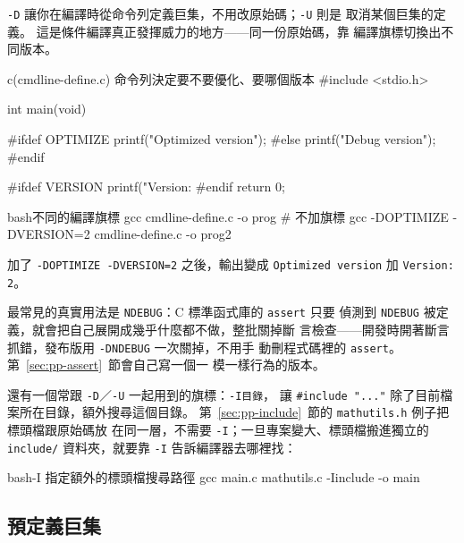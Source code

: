 \texttt{-D} 讓你在編譯時從命令列定義巨集，不用改原始碼；\texttt{-U} 則是
取消某個巨集的定義。 這是條件編譯真正發揮威力的地方——同一份原始碼，靠
編譯旗標切換出不同版本。

\begin{example}{c}{(cmdline-define.c) 命令列決定要不要優化、要哪個版本}
#include <stdio.h>

int main(void) {
#ifdef OPTIMIZE
    printf("Optimized version\n");
#else
    printf("Debug version\n");
#endif

#ifdef VERSION
    printf("Version: %
#endif
    return 0;
}
\end{example}

\begin{code}{bash}{不同的編譯旗標}
gcc cmdline-define.c -o prog                     # 不加旗標
gcc -DOPTIMIZE -DVERSION=2 cmdline-define.c -o prog2
\end{code}


加了 \texttt{-DOPTIMIZE -DVERSION=2} 之後，輸出變成 \texttt{Optimized
version} 加 \texttt{Version: 2}。

最常見的真實用法是 \texttt{NDEBUG}：C 標準函式庫的 \texttt{assert} 只要
偵測到 \texttt{NDEBUG} 被定義，就會把自己展開成幾乎什麼都不做，整批關掉斷
言檢查——開發時開著斷言抓錯，發布版用 \texttt{-DNDEBUG} 一次關掉，不用手
動刪程式碼裡的 \texttt{assert}。 第~\ref{sec:pp-assert}~節會自己寫一個一
模一樣行為的版本。

還有一個常跟 \texttt{-D}／\texttt{-U} 一起用到的旗標：\texttt{-I目錄}，
讓 \texttt{\#include "..."} 除了目前檔案所在目錄，額外搜尋這個目錄。
第~\ref{sec:pp-include}~節的 \texttt{mathutils.h} 例子把標頭檔跟原始碼放
在同一層，不需要 \texttt{-I}；一旦專案變大、標頭檔搬進獨立的
\texttt{include/} 資料夾，就要靠 \texttt{-I} 告訴編譯器去哪裡找：

\begin{code}{bash}{-I 指定額外的標頭檔搜尋路徑}
gcc main.c mathutils.c -Iinclude -o main
\end{code}


\subsection{預定義巨集}

